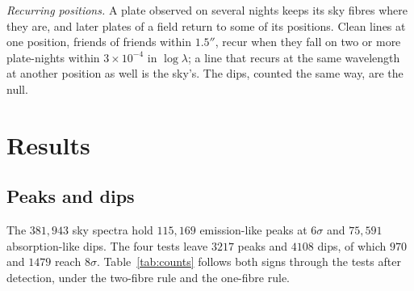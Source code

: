 \documentclass[3p,11pt]{elsarticle}
\begin{document}
\emph{Recurring positions.} A plate observed on several nights keeps its sky fibres where
they are, and later plates of a field return to some of its positions. Clean lines at one
position, friends of friends within $1.5''$, recur when they fall on two or more
plate-nights within $3\times10^{-4}$ in $\log\lambda$; a line that recurs at the same
wavelength at another position as well is the sky's. The dips, counted the same way, are
the null.

\section{Results}\label{sec:results}

\subsection{Peaks and dips}

The $381{,}943$ sky spectra hold $115{,}169$ emission-like peaks at $6\sigma$ and
$75{,}591$ absorption-like dips. The four tests leave $3217$ peaks and $4108$ dips, of
which $970$ and $1479$ reach $8\sigma$. Table~\ref{tab:counts} follows both signs through
the tests after detection, under the two-fibre rule and the one-fibre rule.
\end{document}
